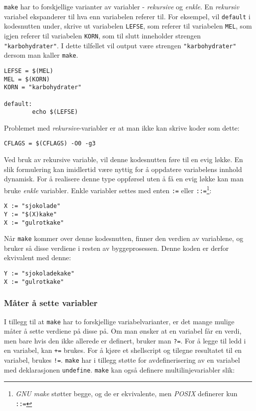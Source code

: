 \begin{alphasection}
\verb|make| har to forskjellige varianter av variabler - \textit{rekursive} og \textit{enkle}. En \textit{rekursiv} variabel ekspanderer til hva enn variabelen referer til. For eksempel, vil \verb|default| i kodesnutten under, skrive ut variabelen \verb|LEFSE|, som referer til variabelen \verb|MEL|, som igjen referer til variabelen \verb|KORN|, som til slutt inneholder strengen \verb|"karbohydrater"|. I dette tilfellet vil output være strengen \verb|"karbohydrater"| dersom man kaller \verb|make|.

\begin{lstlisting}
LEFSE = $(MEL)
MEL = $(KORN)
KORN = "karbohydrater"

default:
        echo $(LEFSE)
\end{lstlisting}

Problemet med \textit{rekursive}-variabler er at man ikke kan skrive koder som dette:

\begin{lstlisting}
CFLAGS = $(CFLAGS) -O0 -g3
\end{lstlisting}
Ved bruk av rekursive variable, vil denne kodesnutten føre til en evig løkke. 
En slik formulering kan imidlertid være nyttig for å oppdatere variabelens innhold dynamisk. 
For å realisere denne type oppførsel uten å få en evig løkke kan man bruke \textit{enkle} variabler. Enkle variabler settes med enten \verb|:=| eller \verb|::=|\footnote{\textit{GNU make} støtter begge, og de er ekvivalente, men \textit{POSIX} definerer kun \texttt{::=}}:
\begin{lstlisting}
X := "sjokolade"
Y := "$(X)kake"
X := "gulrotkake"
\end{lstlisting}

Når \verb|make| kommer over denne kodesnutten, finner den verdien av variablene, og bruker så disse verdiene i resten av byggeprosessen. Denne koden er derfor ekvivalent med denne:

\begin{lstlisting}
Y := "sjokoladekake"
X := "gulrotkake"
\end{lstlisting}

\subsubsection{Måter å sette variabler}

I tillegg til at \verb|make| har to forskjellige variabelvarianter, er det mange mulige måter å sette verdiene på disse på. Om man ønsker at en variabel får en verdi, men bare hvis den ikke allerede er definert, bruker man \verb|?=|. For å legge til ledd i en variabel, kan \verb|+=| brukes. For å kjøre et shellscript og tilegne resultatet til en variabel, brukes \verb|!=|. \verb|make| har i tillegg støtte for avdefinerisering av en variabel med deklarasjonen \verb|undefine|. \verb|make| kan også definere multilinjevariabler slik:


\end{alphasection}
